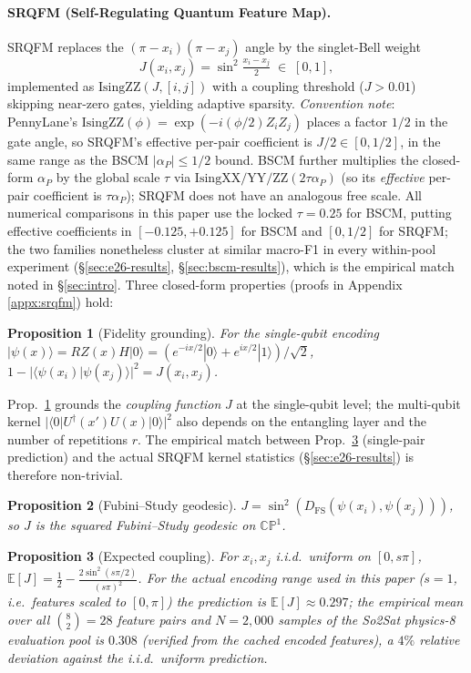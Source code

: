 \documentclass[pdflatex,sn-mathphys]{sn-jnl}
\theoremstyle{plain}
\newtheorem{proposition}{Proposition}
\theoremstyle{remark}
\theoremstyle{definition}
\begin{document}
\paragraph{SRQFM (Self-Regulating Quantum Feature Map).}\label{sec:srqfm}
SRQFM replaces the $(\pi-x_i)(\pi-x_j)$ angle by the singlet-Bell weight
\[
J(x_i,x_j) = \sin^2\!\tfrac{x_i-x_j}{2} \;\in\; [0, 1],
\]
implemented as $\mathrm{IsingZZ}(J,[i,j])$ with a coupling threshold ($J>0.01$) skipping near-zero gates, yielding adaptive sparsity.  \emph{Convention note}: PennyLane's $\mathrm{IsingZZ}(\phi)\!=\!\exp(-i(\phi/2) Z_iZ_j)$ places a factor $1/2$ in the gate angle, so SRQFM's effective per-pair coefficient is $J/2\!\in\![0,1/2]$, in the same range as the BSCM $|\alpha_P|\le 1/2$ bound.  BSCM further multiplies the closed-form $\alpha_P$ by the global scale $\tau$ via $\mathrm{IsingXX/YY/ZZ}(2\tau\alpha_P)$ (so its \emph{effective} per-pair coefficient is $\tau\alpha_P$); SRQFM does not have an analogous free scale.  All numerical comparisons in this paper use the locked $\tau=0.25$ for BSCM, putting effective coefficients in $[-0.125,+0.125]$ for BSCM and $[0,1/2]$ for SRQFM; the two families nonetheless cluster at similar macro-F1 in every within-pool experiment (\S\ref{sec:e26-results}, \S\ref{sec:bscm-results}), which is the empirical match noted in \S\ref{sec:intro}. Three closed-form properties (proofs in Appendix \ref{appx:srqfm}) hold:

\begin{proposition}[Fidelity grounding]\label{prop:fid}
For the single-qubit encoding $|\psi(x)\rangle = RZ(x)H|0\rangle = (e^{-ix/2}|0\rangle + e^{ix/2}|1\rangle)/\sqrt{2}$, $1-|\langle\psi(x_i)|\psi(x_j)\rangle|^2=J(x_i,x_j)$.
\end{proposition}

\noindent Prop.~\ref{prop:fid} grounds the \emph{coupling function} $J$ at the single-qubit level; the multi-qubit kernel $|\langle 0|U^\dagger(x')U(x)|0\rangle|^2$ also depends on the entangling layer and the number of repetitions $r$. The empirical match between Prop.~\ref{prop:exp} (single-pair prediction) and the actual SRQFM kernel statistics (\S\ref{sec:e26-results}) is therefore non-trivial.

\begin{proposition}[Fubini--Study geodesic]\label{prop:fs}
$J=\sin^2(D_{\mathrm{FS}}(\psi(x_i),\psi(x_j)))$, so $J$ is the squared Fubini--Study geodesic on $\mathbb{CP}^1$.
\end{proposition}

\begin{proposition}[Expected coupling]\label{prop:exp}
For $x_i,x_j$ i.i.d.\ uniform on $[0,s\pi]$,
$\mathbb{E}[J] = \tfrac12 - \tfrac{2\sin^2(s\pi/2)}{(s\pi)^2}$.
For the actual encoding range used in this paper ($s=1$, i.e.\ features scaled to $[0,\pi]$) the prediction is $\mathbb{E}[J] \approx 0.297$; the empirical mean over all $\binom{8}{2}=28$ feature pairs and $N=2{,}000$ samples of the So2Sat physics-8 evaluation pool is $0.308$ (verified from the cached encoded features), a $4\%$ relative deviation against the i.i.d.\ uniform prediction.
\end{proposition}
\end{document}
